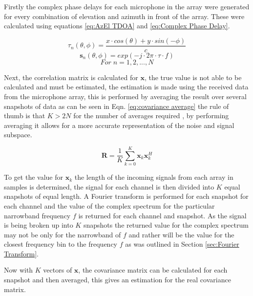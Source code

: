 \documentclass{UoNMCHA}
\numberwithin{equation}{section}
\begin{document}
    Firstly the complex phase delays for each microphone in the array were generated for every combination of elevation and azimuth in front of the array. These were calculated using equations \ref{eq:AzEl TDOA} and \ref{eq:Complex Phase Delay}.
    
    \begin{equation}
        \tau_n(\theta, \phi) = \frac{x \cdot cos(\theta) + y \cdot sin(-\phi)}{c}
        \label{eq:AzEl TDOA}
    \end{equation}
    \begin{equation}
        \mathbf{s}_n(\theta,\phi) = exp(-j \cdot 2\pi \cdot \tau \cdot f)
        \label{eq:Complex Phase Delay}
    \end{equation}
    \begin{equation*}
        For \; n = 1,2,...,N
    \end{equation*}
    
    Next, the correlation matrix is calculated for $\mathbf{x}$, the true value is not able to be calculated and must be estimated, the estimation is made using the received data from the microphone array, this is performed by averaging the result over several snapshots of data as can be seen in Eqn. \ref{eq:covariance average} the rule of thumb is that $K > 2N$ for the number of averages required \citep{Adv13}, by performing averaging it allows for a more accurate representation of the noise and signal subspace. 
    
    \begin{equation}
        \mathbf{R} = \frac{1}{K}\sum_{k=0}^K\mathbf{x}_k\mathbf{x}_k^H
        \label{eq:covariance average}
    \end{equation}

    
    To get the value for $\mathbf{x}_k$ the length of the incoming signals from each array in samples is determined, the signal for each channel is then divided into $K$ equal snapshots of equal length. A Fourier transform is performed for each snapshot for each channel and the value of the complex spectrum for the particular narrowband frequency $f$ is returned for each channel and snapshot. As the signal is being broken up into $K$ snapshots the returned value for the complex spectrum may not be only for the narrowband of $f$ and rather will be the value for the closest frequency bin to the frequency $f$ as was outlined in Section \ref{sec:Fourier Transform}.
    
    Now with $K$ vectors of $\mathbf{x}$, the covariance matrix can be calculated for each snapshot and then averaged, this gives an estimation for the real covariance matrix.
    
\end{document}
